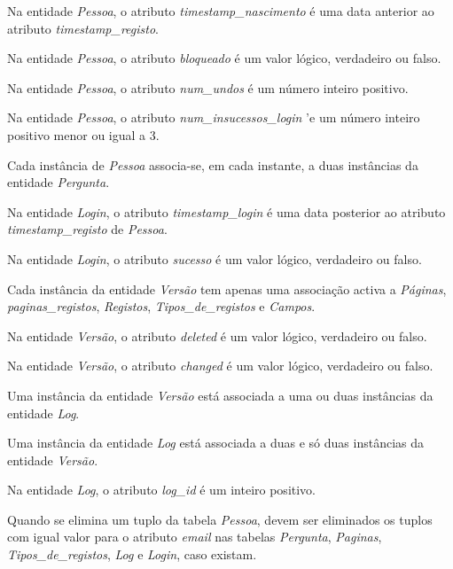 \documentclass[11pt,a4paper]{article}
\begin{document}
\begin{description}[itemsep=3em]
  \item[RI1] Na entidade \textit{Pessoa}, o atributo \textit{timestamp\_nascimento} \'{e} uma data anterior ao atributo \textit{timestamp\_registo}.
  \item[RI2] Na entidade \textit{Pessoa}, o atributo \textit{bloqueado} \'{e} um valor l\'{o}gico, verdadeiro ou falso.


  \item[RI3] Na entidade \textit{Pessoa}, o atributo \textit{num\_undos} \'{e} um n\'{u}mero inteiro positivo.


  \item[RI4] Na entidade \textit{Pessoa}, o atributo \textit{num\_insucessos\_login} '{e} um n\'{u}mero inteiro positivo menor ou igual a 3.
  \item[RI5] Cada instância de \textit{Pessoa} associa-se, em cada instante, a duas instâncias da entidade \textit{Pergunta}.
  \item[RI6] Na entidade \textit{Login}, o atributo \textit{timestamp\_login} \'{e} uma data posterior ao atributo \textit{timestamp\_registo} de \textit{Pessoa}.
  \item[RI7] Na entidade \textit{Login}, o atributo \textit{sucesso} \'{e} um valor l\'{o}gico, verdadeiro ou falso.
  \item[RI8] Cada instância da entidade \textit{Versão} tem apenas uma associação activa a \textit{P\'{a}ginas}, \textit{paginas\_registos}, \textit{Registos}, \textit{Tipos\_de\_registos} e \textit{Campos}.
  \item[RI9] Na entidade \textit{Versão}, o atributo \textit{deleted} \'{e} um valor l\'{o}gico, verdadeiro ou falso.
  \item[RI10] Na entidade \textit{Versão}, o atributo \textit{changed} \'{e} um valor l\'{o}gico, verdadeiro ou falso.
  \item[RI11] Uma instância da entidade \textit{Versão} est\'{a} associada a uma ou duas instâncias da entidade \textit{Log}.
  \item[RI12] Uma instância da entidade \textit{Log} está associada a duas e s\'{o} duas instâncias da entidade \textit{Versão}.
  \item[RI13] Na entidade \textit{Log}, o atributo \textit{log\_id} \'{e} um inteiro positivo.
  \item[RI14] Quando se elimina um tuplo da tabela \textit{Pessoa}, devem ser eliminados os
tuplos com igual valor para o atributo \textit{email} nas tabelas \textit{Pergunta}, \textit{Paginas},
\textit{Tipos\_de\_registos}, \textit{Log} e \textit{Login}, caso existam.


\end{description}
\end{document}
